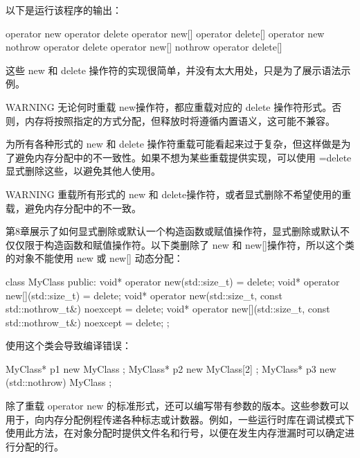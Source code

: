 以下是运行该程序的输出：

\begin{shell}
operator new
operator delete
operator new[]
operator delete[]
operator new nothrow
operator delete
operator new[] nothrow
operator delete[]
\end{shell}

这些 new 和 delete 操作符的实现很简单，并没有太大用处，只是为了展示语法示例。

\begin{myWarning}{WARNING}
无论何时重载 new操作符，都应重载对应的 delete 操作符形式。否则，内存将按照指定的方式分配，但释放时将遵循内置语义，这可能不兼容。
\end{myWarning}

为所有各种形式的 new 和 delete 操作符重载可能看起来过于复杂，但这样做是为了避免内存分配中的不一致性。如果不想为某些重载提供实现，可以使用 =delete 显式删除这些，以避免其他人使用。

\begin{myWarning}{WARNING}
重载所有形式的 new 和 delete操作符，或者显式删除不希望使用的重载，避免内存分配中的不一致。
\end{myWarning}


第8章展示了如何显式删除或默认一个构造函数或赋值操作符，显式删除或默认不仅仅限于构造函数和赋值操作符。以下类删除了 new 和 new[]操作符，所以这个类的对象不能使用 new 或 new[] 动态分配：

\begin{cpp}
class MyClass
{
    public:
        void* operator new(std::size_t) = delete;
        void* operator new[](std::size_t) = delete;
        void* operator new(std::size_t, const std::nothrow_t&) noexcept = delete;
        void* operator new[](std::size_t, const std::nothrow_t&) noexcept = delete;
};
\end{cpp}

使用这个类会导致编译错误：

\begin{cpp}
MyClass* p1 { new MyClass };
MyClass* p2 { new MyClass[2] };
MyClass* p3 { new (std::nothrow) MyClass };
\end{cpp}


除了重载 operator new 的标准形式，还可以编写带有参数的版本。这些参数可以用于，向内存分配例程传递各种标志或计数器。例如，一些运行时库在调试模式下使用此方法，在对象分配时提供文件名和行号，以便在发生内存泄漏时可以确定进行分配的行。


